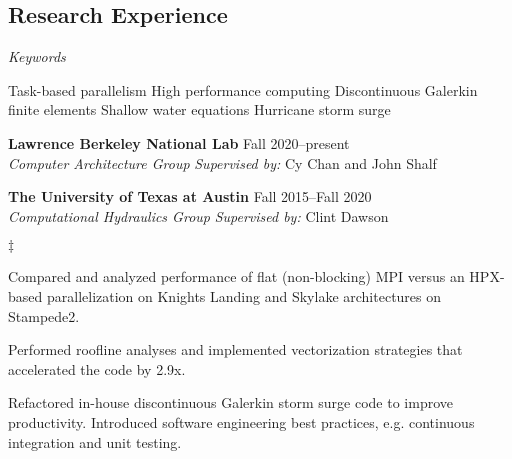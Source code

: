 \documentclass[margin,line]{res}
\newenvironment{list1}{
  \begin{list}{\ding{113}}{%
      \setlength{\itemsep}{0in}
      \setlength{\parsep}{0in} \setlength{\parskip}{0in}
      \setlength{\topsep}{0in} \setlength{\partopsep}{0in}
      \setlength{\leftmargin}{0.17in}}}{\end{list}}
\newenvironment{list2}{
  \begin{list}{$\ddagger$}{%
      \setlength{\itemsep}{0in}
      \setlength{\parsep}{0in} \setlength{\parskip}{0in}
      \setlength{\topsep}{0in} \setlength{\partopsep}{0in}
      \setlength{\leftmargin}{0.2in}}}{\end{list}}
\def\keywordgap{\hspace{2pt minus.5pt}}
\newcommand\keywordsep{\keywordgap\textbullet\keywordgap}
\begin{document}
\begin{resume}
\section{\sc Research Experience}
\textit{Keywords}
\vspace{0.05in}
\begin{list1}
\item[] Task-based parallelism \keywordsep High performance computing \keywordsep Discontinuous Galerkin finite elements \keywordsep Shallow water equations \keywordsep Hurricane storm surge
\end{list1}


\textbf{Lawrence Berkeley National Lab} \hfill Fall 2020--present\\
\textit{Computer Architecture Group} \hfill {\it Supervised by:} Cy Chan and John Shalf\\
\vspace{-0.1in}

\textbf{The University of Texas at Austin} \hfill Fall 2015--Fall 2020\\
\textit{Computational Hydraulics Group}
\hfill {\it Supervised by:} Clint Dawson\\
\vspace{-0.1in}
\begin{list2}
\item Compared and analyzed performance of flat (non-blocking) MPI versus an HPX-based parallelization on Knights Landing and Skylake architectures on Stampede2.
\item Performed roofline analyses and implemented vectorization strategies that accelerated the code by 2.9x.
\item Refactored in-house discontinuous Galerkin storm surge code to improve productivity. Introduced software engineering best practices, e.g. continuous integration and unit testing.
\end{list2}


\end{resume}
\end{document}

